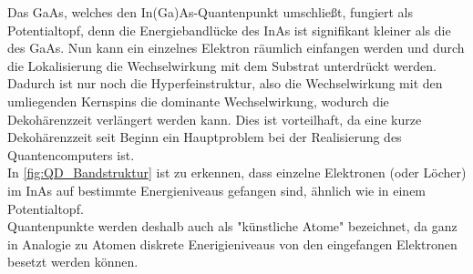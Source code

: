 \noindent Das GaAs, welches den In(Ga)As-Quantenpunkt umschließt, fungiert als Potentialtopf, denn die Energiebandlücke des InAs ist 
signifikant kleiner als die des GaAs. Nun kann ein einzelnes Elektron räumlich einfangen werden und durch die Lokalisierung 
die Wechselwirkung mit dem Substrat unterdrückt werden. Dadurch ist nur noch die Hyperfeinstruktur, also die Wechselwirkung mit den 
umliegenden Kernspins die dominante Wechselwirkung, wodurch die Dekohärenzzeit verlängert werden kann. Dies ist vorteilhaft, da 
eine kurze Dekohärenzzeit seit Beginn ein Hauptproblem bei der Realisierung des Quantencomputers ist.\\
In \autoref{fig:QD_Bandstruktur} ist zu erkennen, dass einzelne Elektronen (oder Löcher)
im InAs auf bestimmte Energieniveaus gefangen sind, ähnlich wie in einem Potentialtopf.\\
Quantenpunkte werden deshalb auch als "künstliche Atome" bezeichnet, da ganz in Analogie zu Atomen diskrete Enerigieniveaus 
von den eingefangen Elektronen besetzt werden können.
